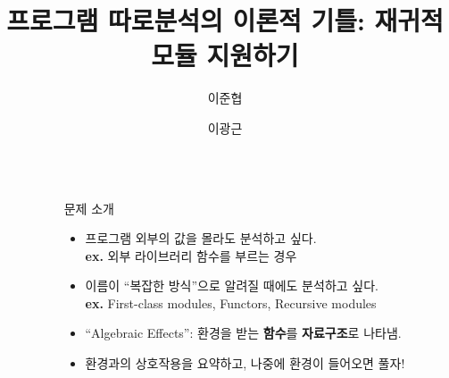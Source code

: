 \documentclass[final]{beamer}
\title{프로그램 따로분석의 이론적 기틀: 재귀적 모듈 지원하기}
\author{이준협 \and 이광근}
\institute[shortinst]{서울대학교 프로그래밍 연구실 (ROPAS)}
\newlength{\sepwidth}
\newlength{\colwidth}
\newcommand{\separatorcolumn}{\begin{column}{\sepwidth}\end{column}}
\begin{document}
\begin{frame}[t]
  \begin{columns}[t]
    \separatorcolumn

    \begin{column}{\colwidth}
      \begin{block}{문제 소개}
        \begin{itemize}
          \item 프로그램 외부의 값을 몰라도 분석하고 싶다.\\
                \textbf{ex. }외부 라이브러리 함수를 부르는 경우
          \item 이름이 ``복잡한 방식''으로 알려질 때에도 분석하고 싶다.\\
                \textbf{ex. }First-class modules, Functors, Recursive modules
        \end{itemize}
        \begin{itemize}
          \item ``Algebraic Effects'': 환경을 받는 \textbf{함수}를 \textbf{자료구조}로 나타냄.
          \item 환경과의 상호작용을 요약하고, 나중에 환경이 들어오면 풀자!
        \end{itemize}
      \end{block}


\end{column}
\end{columns}
\end{frame}
\end{document}
